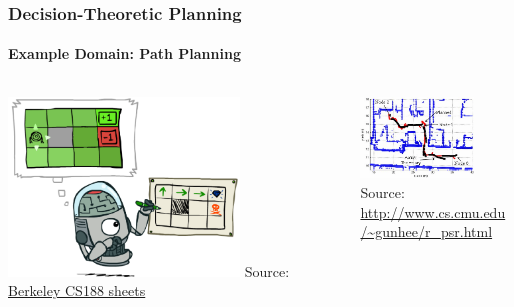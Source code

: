 \begin{frame}
\frametitle{Decision-Theoretic Planning}
\framesubtitle{Example Domain: Path Planning}
\centering

\begin{columns}[T]
	\begin{column}{.6\textwidth}
		\centering
	\includegraphics[width=0.7\textwidth]{figures/path-planning3}
	\vfill
	{\tiny Source: \href{http://ai.berkeley.edu/lecture_slides.html}{Berkeley CS188 sheets}}
	\end{column}
	\begin{column}{.5\textwidth}
		\centering
		\vspace{20pt}
		\includegraphics[width=0.75\textwidth]{figures/path-planning4}\\
		\vspace{2.5pt}
		{\tiny Source: \url{http://www.cs.cmu.edu/~gunhee/r\_psr.html}}
	\end{column}
\end{columns}

\end{frame}


